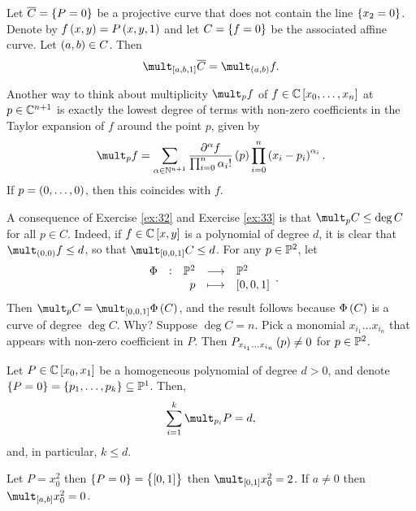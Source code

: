 \begin{exercise**}
\label{ex:33}
Let $ \overline{C} = \cbr{P = 0} $ be a projective curve that does not contain the line $ \cbr{x_2 = 0} $. Denote by $ f\br{x, y} = P\br{x, y, 1} $ and let $ C = \cbr{f = 0} $ be the associated affine curve. Let $ \br{a, b} \in C $. Then
$$ \mult_{\sbr{a, b, 1}} \overline{C} = \mult_{\br{a, b}} f. $$
\end{exercise**}

\begin{note*}
Another way to think about multiplicity $ \mult_p f $ of $ f \in \CC\sbr{x_0, \dots, x_n} $ at $ p \in \mathbb{C}^{n + 1} $ is exactly the lowest degree of terms with non-zero coefficients in the Taylor expansion of $ f $ around the point $ p $, given by
$$ \mult_p f = \sum_{\alpha \in \NN^{n + 1}} \dfrac{\partial^\alpha f}{\prod_{i = 0}^n \alpha_i!}\br{p}\prod_{i = 0}^n \br{x_i - p_i}^{\alpha_i}. $$
If $ p = \br{0, \dots, 0} $, then this coincides with $ f $.
\end{note*}

\begin{remark}
\label{rem:11.4}
A consequence of Exercise \ref{ex:32} and Exercise \ref{ex:33} is that $ \mult_p C \le \deg C $ for all $ p \in C $. Indeed, if $ f \in \CC\sbr{x, y} $ is a polynomial of degree $ d $, it is clear that $ \mult_{\br{0, 0}} f \le d $, so that $ \mult_{\sbr{0, 0, 1}} C \le d $. For any $ p \in \mathbb{P}^2 $, let
$$ \function[\Phi]{\PP^2}{\PP^2}{p}{\sbr{0, 0, 1}}. $$
Then $ \mult_p C = \mult_{\sbr{0, 0, 1}} \Phi\br{C} $, and the result follows because $ \Phi\br{C} $ is a curve of degree $ \deg C $. Why? Suppose $ \deg C = n $. Pick a monomial $ x_{i_1} \dots x_{i_n} $ that appears with non-zero coefficient in $ P $. Then $ P_{x_{i_1} \dots x_{i_n}}\br{p} \ne 0 $ for $ p \in \mathbb{P}^2 $.
\end{remark}

\begin{lemma}
\label{lem:11.5}
Let $ P \in \CC\sbr{x_0, x_1} $ be a homogeneous polynomial of degree $ d > 0 $, and denote $ \cbr{P = 0} = \cbr{p_1, \dots, p_k} \subseteq \PP^1 $. Then,
$$ \sum_{i = 1}^k \mult_{p_i} P = d, $$
and, in particular, $ k \le d $.
\end{lemma}

\begin{example*}
Let $ P = x_0^2 $ then $ \cbr{P = 0} = \cbr{\sbr{0, 1}} $ then $ \mult_{\sbr{0, 1}} x_0^2 = 2 $. If $ a \ne 0 $ then $ \mult_{\sbr{a, b}} x_0^2 = 0 $.
\end{example*}

